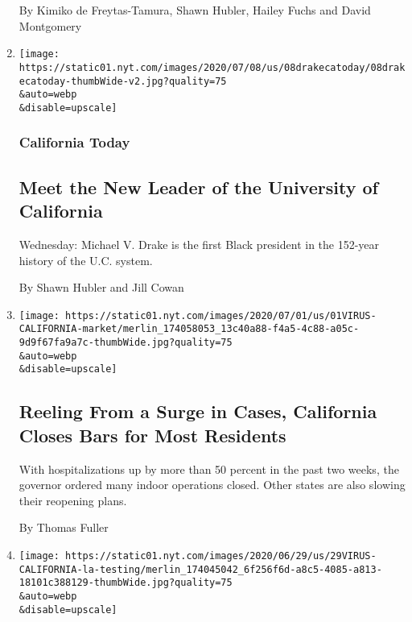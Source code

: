 \begin{enumerate}
  By Kimiko de Freytas-Tamura, Shawn Hubler, Hailey Fuchs and David
  Montgomery
\item
  \href{/2020/07/08/us/new-university-california-president-michael-drake.html}{}

  \texttt{[image: https://static01.nyt.com/images/2020/07/08/us/08drakecatoday/08drakecatoday-thumbWide-v2.jpg?quality=75\\\&auto=webp\\\&disable=upscale]}

  \hypertarget{california-today}{%
  \subsubsection{California Today}\label{california-today}}

  \hypertarget{meet-the-new-leader-of-the-university-of-california}{%
  \subsection{Meet the New Leader of the University of
  California}\label{meet-the-new-leader-of-the-university-of-california}}

  Wednesday: Michael V. Drake is the first Black president in the
  152-year history of the U.C. system.

  By Shawn Hubler and Jill Cowan
\item
  \href{/2020/07/01/us/california-coronavirus-reopening.html}{}

  \texttt{[image: https://static01.nyt.com/images/2020/07/01/us/01VIRUS-CALIFORNIA-market/merlin\_174058053\_13c40a88-f4a5-4c88-a05c-9d9f67fa9a7c-thumbWide.jpg?quality=75\\\&auto=webp\\\&disable=upscale]}

  \hypertarget{reeling-from-a-surge-in-cases-california-closes-bars-for-most-residents}{%
  \subsection{Reeling From a Surge in Cases, California Closes Bars for
  Most
  Residents}\label{reeling-from-a-surge-in-cases-california-closes-bars-for-most-residents}}

  With hospitalizations up by more than 50 percent in the past two
  weeks, the governor ordered many indoor operations closed. Other
  states are also slowing their reopening plans.

  By Thomas Fuller
\item
  \href{/2020/06/29/us/california-coronavirus-reopening.html}{}

  \texttt{[image: https://static01.nyt.com/images/2020/06/29/us/29VIRUS-CALIFORNIA-la-testing/merlin\_174045042\_6f256f6d-a8c5-4085-a813-18101c388129-thumbWide.jpg?quality=75\\\&auto=webp\\\&disable=upscale]}


\end{enumerate}
